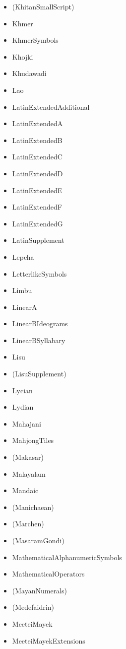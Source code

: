 \documentclass{article}
\newenvironment{itemlist}{%
  \begin{itemize}
  \setlength{\itemsep}{0pt}
  \setlength{\parsep}{0pt}
  \setlength{\topsep}{0pt}
  \setlength{\partopsep}{0pt}
  \setlength{\parskip}{0pt}
  \setlength{\labelsep}{5pt}}%
{
  \end{itemize}}
\begin{document}
\begin{multicols*}{2}
\begin{itemlist}
        \item (KhitanSmallScript)
        \item Khmer
        \item KhmerSymbols
        \item Khojki
        \item Khudawadi
        \item Lao
        \item LatinExtendedAdditional
        \item LatinExtendedA
        \item LatinExtendedB
        \item LatinExtendedC
        \item LatinExtendedD
        \item LatinExtendedE
        \item LatinExtendedF
        \item LatinExtendedG
        \item LatinSupplement
        \item Lepcha
        \item LetterlikeSymbols
        \item Limbu
        \item LinearA
        \item LinearBIdeograms
        \item LinearBSyllabary
        \item Lisu
        \item (LisuSupplement)
        \item Lycian
        \item Lydian
        \item Mahajani
        \item MahjongTiles
        \item (Makasar)
        \item Malayalam
        \item Mandaic
        \item (Manichaean)
        \item (Marchen)
        \item (MasaramGondi)
        \item MathematicalAlphanumericSymbols
        \item MathematicalOperators
        \item (MayanNumerals)
        \item (Medefaidrin)
        \item MeeteiMayek
        \item MeeteiMayekExtensions

\end{itemlist}
\end{multicols*}
\end{document}
